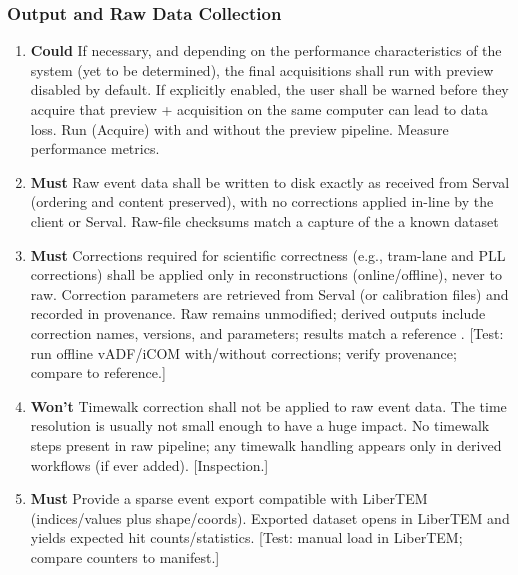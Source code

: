 \documentclass[10pt]{article}
\newcommand{\PriorityTag}[2]{%
  \colorbox{#2!25}{\footnotesize\textsf{\textbf{#1}}}\hspace{0.6em}}
\newcommand{\must}{\leavevmode\PriorityTag{Must}{green}}
\newcommand{\could}{\leavevmode\PriorityTag{Could}{cyan}}
\newcommand{\wont}{\leavevmode\PriorityTag{Won't}{red}}
\newcounter{reqgrp}[section] %
\newcounter{reqno}
\newcommand{\reqprefix}{GEN}
\newenvironment{requirements}[1]{%
  \renewcommand{\reqprefix}{#1}%
  \refstepcounter{reqgrp}%
  \setcounter{reqno}{0}%
  \begin{enumerate}[leftmargin=*]
}{\end{enumerate}}
\begin{document}
\subsubsection{Output and Raw Data Collection}
\begin{requirements}{OUT}

\item \could {}
  {If necessary, and depending on the performance characteristics of the system (yet to be determined), the final acquisitions shall run with preview disabled by default. If explicitly enabled, the user shall be warned before they acquire that preview + acquisition on the same computer can lead to data loss.}
  {Run (Acquire) with and without the preview pipeline. Measure performance metrics.}

\item \must {}
  {Raw event data shall be written to disk exactly as received from Serval (ordering and content preserved), with no corrections applied in-line by the client or Serval.}
  {Raw-file checksums match a capture of the a known dataset}

\item \must {}
  {Corrections required for scientific correctness (e.g., tram-lane and PLL corrections) shall be applied only in reconstructions (online/offline), never to raw. Correction parameters are retrieved from Serval (or calibration files) and recorded in provenance.}
  {Raw remains unmodified; derived outputs include correction names, versions, and parameters; results match a reference .}
  [Test: run offline vADF/iCOM with/without corrections; verify provenance; compare to reference.]

\item \wont {}
  {Timewalk correction shall not be applied to raw event data. The time resolution is usually not small enough to have a huge impact.}
  {No timewalk steps present in raw pipeline; any timewalk handling appears only in derived workflows (if ever added).}
  [Inspection.]

\item \must {}
  {Provide a sparse event export compatible with LiberTEM (indices/values plus shape/coords).}
  {Exported dataset opens in LiberTEM and yields expected hit counts/statistics.}
  [Test: manual load in LiberTEM; compare counters to manifest.]


\end{requirements}
\end{document}
